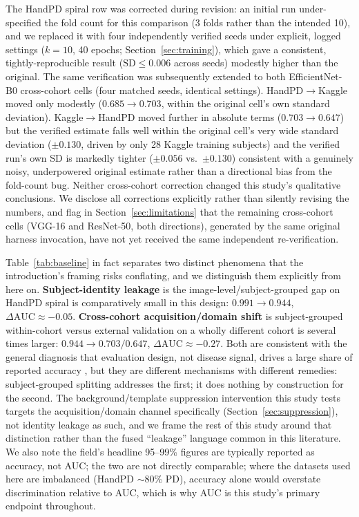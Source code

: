 \documentclass[3p,final,10pt]{elsarticle}
\begin{document}
The HandPD spiral row was corrected during revision: an initial run
under-specified the fold count for this comparison (3 folds rather than
the intended 10), and we replaced it with four independently verified
seeds under explicit, logged settings ($k{=}10$, 40 epochs;
Section~\ref{sec:training}), which gave a consistent, tightly-reproducible
result ($\mathrm{SD}\le0.006$ across seeds) modestly higher than the
original. The same verification was subsequently extended to both
EfficientNet-B0 cross-cohort cells (four matched seeds, identical
settings). HandPD$\to$Kaggle moved only modestly ($0.685\to0.703$, within
the original cell's own standard deviation). Kaggle$\to$HandPD moved
further in absolute terms ($0.703\to0.647$) but the verified estimate
falls well within the original cell's very wide standard deviation
($\pm0.130$, driven by only 28 Kaggle training subjects) and the verified
run's own SD is markedly tighter ($\pm0.056$ vs.\ $\pm0.130$) consistent
with a genuinely noisy, underpowered original estimate rather than a
directional bias from the fold-count bug. Neither cross-cohort correction
changed this study's qualitative conclusions. We disclose all corrections
explicitly rather than silently revising the numbers, and flag in
Section~\ref{sec:limitations} that the remaining cross-cohort cells
(VGG-16 and ResNet-50, both directions), generated by the same original
harness invocation, have not yet received the same independent
re-verification.

Table~\ref{tab:baseline} in fact separates two distinct phenomena that the
introduction's framing risks conflating, and we distinguish them
explicitly from here on. \textbf{Subject-identity leakage} is the
image-level/subject-grouped gap on HandPD spiral is comparatively small
in this design: $0.991\to0.944$, $\Delta\mathrm{AUC}\approx-0.05$.
\textbf{Cross-cohort acquisition/domain shift} is subject-grouped
within-cohort versus external validation on a wholly different cohort
is several times larger: $0.944\to0.703/0.647$,
$\Delta\mathrm{AUC}\approx-0.27$. Both are consistent with the general
diagnosis that evaluation design, not disease signal, drives a large share
of reported accuracy \cite{tampu2022,geirhos2020,degrave2021}, but they are
different mechanisms with different remedies: subject-grouped splitting
addresses the first; it does nothing by construction for the second. The
background/template suppression intervention this study tests targets the
acquisition/domain channel specifically (Section~\ref{sec:suppression}),
not identity leakage as such, and we frame the rest of this study around
that distinction rather than the fused ``leakage'' language common in this
literature. We also note the field's headline 95--99\% figures are
typically reported as accuracy, not AUC; the two are not directly
comparable; where the datasets used here are imbalanced (HandPD $\sim$80\%
PD), accuracy alone would overstate discrimination relative to AUC, which
is why AUC is this study's primary endpoint throughout.
\end{document}
